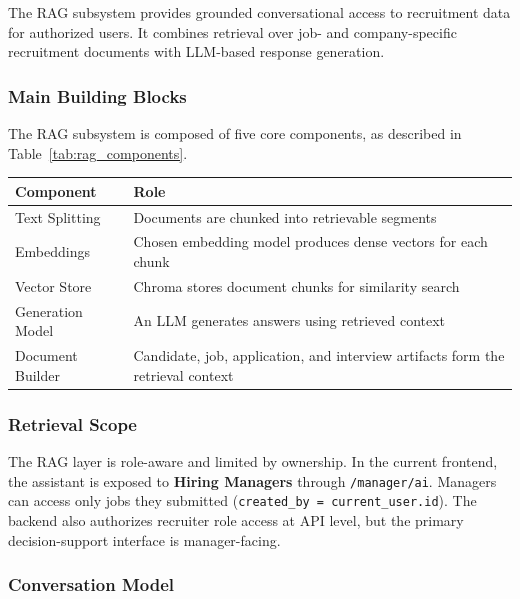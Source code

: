 The RAG subsystem provides grounded conversational access to recruitment data for authorized users. It combines retrieval over job- and company-specific recruitment documents with LLM-based response generation.

\subsubsection{Main Building Blocks}

The RAG subsystem is composed of five core components, as described in Table~\ref{tab:rag_components}.

\begin{center}
\label{tab:rag_components}
\renewcommand{\arraystretch}{0.8}
\begin{tabularx}{\textwidth}{|p{3.5cm}|l|}
\hline
\rowcolor{gray!20} \textbf{Component} & \textbf{Role} \\
\hline
Text Splitting & Documents are chunked into retrievable segments \\
\hline
Embeddings & Chosen embedding model produces dense vectors for each chunk \\
\hline
Vector Store & Chroma stores document chunks for similarity search \\
\hline
Generation Model & An LLM generates answers using retrieved context \\
\hline
Document Builder & Candidate, job, application, and interview artifacts form the retrieval context \\
\hline
\end{tabularx}
\end{center}

\subsubsection{Retrieval Scope}

The RAG layer is role-aware and limited by ownership. In the current frontend, the assistant is exposed to \textbf{Hiring Managers} through \texttt{/manager/ai}. Managers can access only jobs they submitted (\texttt{created\_by = current\_user.id}). The backend also authorizes recruiter role access at API level, but the primary decision-support interface is manager-facing.

\subsubsection{Conversation Model}

